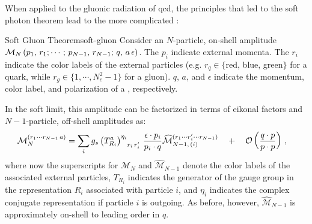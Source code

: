When applied to the gluonic radiation of \gls{qcd}, the principles that led to the soft photon theorem lead to the more complicated :
\begin{theorembox}{Soft Gluon Theorem}{soft-gluon}
    Consider an \(N\)-particle, on-shell amplitude \(\mathcal{M}_N\left(p_1,\,r_1; \cdots;\,p_{N-1},\,r_{N-1};\,q,\,a\,\epsilon\right)\).
    The \(p_i\) indicate external momenta.
    The \(r_i\) indicate the color labels of the external particles (e.g. \(r_q \in \{\)red, blue, green\(\}\) for a quark, while \(r_g \in \{1,\cdots,N_c^2-1\}\) for a gluon).
    \(q\), \(a\), and \(\epsilon\) indicate the momentum, color label, and polarization of a , respectively.

    In the soft limit, this amplitude can be factorized in terms of eikonal factors and \(N-1\)-particle, off-shell amplitudes as:
    \begin{equation}
    \begin{aligned}
        \mathcal{M}^{(r_1\cdots r_{N-1}\,a)}_N
        &=
        \sum_{i}
        g_s
        \le(T^a_{R_i}\ri)\indices{^{\eta_i}_{r_i\,r'_i}}
        \,
        \frac{\epsilon \cdot p_i}{p_i \cdot q}
        \widehat{\mathcal{M}}
        ^{(r_1\cdots r'_i\cdots r_{N-1})}
        _{N-1,\,(i)}
        \quad
        +
        \quad
        \mathcal{O}\le(\frac{q\cdot p}{p \cdot p}\ri)
        \,,
    \end{aligned}
    \end{equation}
    where now the superscripts for \(\mathcal{M}_N\) and \(\widehat{\mathcal{M}}_{N-1}\) denote the color labels of the associated external particles, \(T_{R_i}\) indicates the generator of the gauge group in the representation \(R_i\) associated with particle \(i\), and \(\eta_i\) indicates the complex conjugate representation if particle \(i\) is outgoing.
    As before, however, \(\widehat{\mathcal{M}}_{N-1}\) is approximately on-shell to leading order in \(q\).
\end{theorembox}


